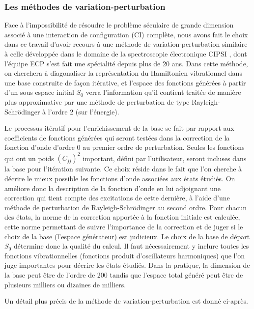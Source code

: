 \documentclass[12pt,a4paper]{book}
\begin{document}
\subsubsection{Les méthodes de variation-perturbation}


Face à l’impossibilité de résoudre le problème séculaire de grande dimension associé à une interaction de configuration (CI) complète, nous avons fait le choix dans ce travail d’avoir recours à une méthode de variation-perturbation similaire à celle développée dans le domaine de la spectroscopie électronique CIPSI \cite{huron1973iterative}, dont l’équipe ECP s’est fait une spécialité depuis plus de 20 ans. Dans cette méthode, on cherchera à diagonaliser la représentation du Hamiltonien vibrationnel dans une base construite de façon itérative, et l’espace des fonctions générées à partir d’un sous espace initial $S_0$ verra l’information qu’il contient traitée de manière plus approximative par une méthode de perturbation de type Rayleigh-Schrödinger à l’ordre 2 (sur l’énergie).

Le processus itératif pour l’enrichissement de la base se fait par rapport aux coefficients de fonctions générées qui seront testées dans la correction de la fonction d’onde d’ordre 0 au premier ordre de perturbation. Seules les fonctions qui ont un poids $(C_{jj})^2$ important, défini par l’utilisateur, seront incluses dans la base pour l’itération suivante. 
Ce choix réside dans le fait que l’on cherche à décrire le mieux possible les fonctions d’onde associées aux états étudiés. On améliore donc la description de la fonction  d’onde en lui adjoignant une correction qui tient compte des excitations de cette dernière, à l’aide d’une méthode de perturbation de Rayleigh-Schrödinger au second ordre. Pour chacun des états, la norme de la correction apportée à la fonction initiale est calculée, cette norme permettant de suivre l’importance de la correction et de juger si le choix de la base (l’espace générateur) est judicieux. Le choix de la base de départ $S_0$ détermine donc la qualité du calcul. Il faut nécessairement y inclure toutes les fonctions vibrationnelles (fonctions produit d’oscillateurs harmoniques) que l’on juge importantes pour décrire les états étudiés. Dans la pratique, la dimension de la base peut être de l’ordre de 200 tandis que l’espace total généré peut être de plusieurs milliers ou dizaines de milliers.

Un détail plus précis de la méthode de variation-perturbation est donné ci-après.
\end{document}

